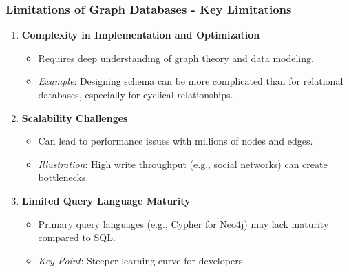 \documentclass[aspectratio=169]{beamer}
\begin{document}
\begin{frame}[fragile]
    \frametitle{Limitations of Graph Databases - Key Limitations}
    \begin{enumerate}
        \item \textbf{Complexity in Implementation and Optimization}
        \begin{itemize}
            \item Requires deep understanding of graph theory and data modeling.
            \item \textit{Example}: Designing schema can be more complicated than for relational databases, especially for cyclical relationships.
        \end{itemize}

        \item \textbf{Scalability Challenges}
        \begin{itemize}
            \item Can lead to performance issues with millions of nodes and edges.
            \item \textit{Illustration}: High write throughput (e.g., social networks) can create bottlenecks.
        \end{itemize}

        \item \textbf{Limited Query Language Maturity}
        \begin{itemize}
            \item Primary query languages (e.g., Cypher for Neo4j) may lack maturity compared to SQL.
            \item \textit{Key Point}: Steeper learning curve for developers.
        \end{itemize}
    \end{enumerate}
\end{frame}
\end{document}
